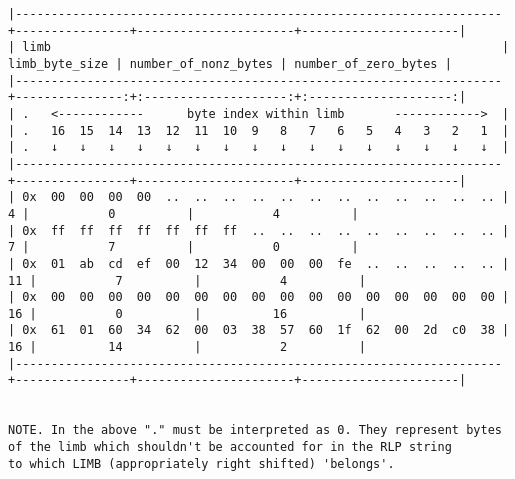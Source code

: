 \documentclass[varwidth=\maxdimen,margin=0.5cm,multi={verbatim}]{standalone}
\begin{document}
\begin{verbatim}
|--------------------------------------------------------------------+----------------+----------------------+----------------------|
| limb                                                               | limb_byte_size | number_of_nonz_bytes | number_of_zero_bytes |
|--------------------------------------------------------------------+---------------:+:--------------------:+:--------------------:|
| .   <------------      byte index within limb       ------------>  |
| .   16  15  14  13  12  11  10  9   8   7   6   5   4   3   2   1  |
| .   ↓   ↓   ↓   ↓   ↓   ↓   ↓   ↓   ↓   ↓   ↓   ↓   ↓   ↓   ↓   ↓  |
|--------------------------------------------------------------------+----------------+----------------------+----------------------|
| 0x  00  00  00  00  ..  ..  ..  ..  ..  ..  ..  ..  ..  ..  ..  .. |              4 |           0          |           4          |
| 0x  ff  ff  ff  ff  ff  ff  ff  ..  ..  ..  ..  ..  ..  ..  ..  .. |              7 |           7          |           0          |
| 0x  01  ab  cd  ef  00  12  34  00  00  00  fe  ..  ..  ..  ..  .. |             11 |           7          |           4          |
| 0x  00  00  00  00  00  00  00  00  00  00  00  00  00  00  00  00 |             16 |           0          |          16          |
| 0x  61  01  60  34  62  00  03  38  57  60  1f  62  00  2d  c0  38 |             16 |          14          |           2          |
|--------------------------------------------------------------------+----------------+----------------------+----------------------|


NOTE. In the above "." must be interpreted as 0. They represent bytes of the limb which shouldn't be accounted for in the RLP string
to which LIMB (appropriately right shifted) 'belongs'.

\end{verbatim}
\end{document}
